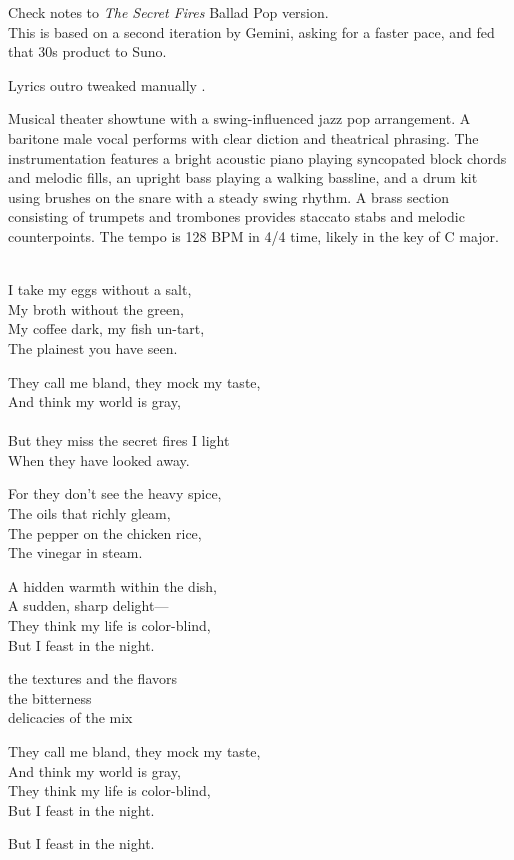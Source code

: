 

\begin{notes}
Check notes to \emph{The Secret Fires} Ballad Pop version.\\
This is based on a second iteration by Gemini, asking for a faster pace, and fed that 30s product to Suno.

Lyrics outro tweaked manually .
\end{notes}
\begin{style}
Musical theater showtune with a swing-influenced jazz pop arrangement. %
A baritone male vocal performs with clear diction and theatrical phrasing. %
The instrumentation features a bright acoustic piano playing syncopated block chords and melodic fills, an upright bass playing a walking bassline, and a drum kit using brushes on the snare with a steady swing rhythm. %
A brass section consisting of trumpets and trombones provides staccato stabs and melodic counterpoints. %
The tempo is 128 BPM in 4/4 time, likely in the key of C major.
\end{style}
\begin{lyrics}
\\
I take my eggs without a salt,\\
My broth without the green,\\
My coffee dark, my fish un-tart,\\
The plainest you have seen.

They call me bland, they mock my taste,\\
And think my world is gray,\\
\\
But they miss the secret fires I light\\
When they have looked away.

For they don't see the heavy spice,\\
The oils that richly gleam,\\
The pepper on the chicken rice,\\
The vinegar in steam.

A hidden warmth within the dish,\\
A sudden, sharp delight—\\
They think my life is color-blind,\\
But I feast in the night.

the textures and the flavors\\
the bitterness\\
delicacies of the mix

They call me bland, they mock my taste,\\
And think my world is gray,\\
They think my life is color-blind,\\
But I feast in the night.

But I feast in the night.
\end{lyrics}


